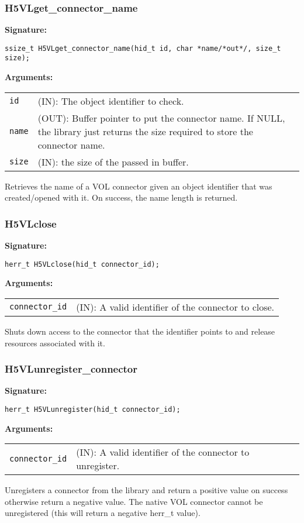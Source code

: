 \subsubsection{H5VLget\_connector\_name}
\begin{mdframed}[style=bgbox]
\textbf{Signature:}
\begin{lstlisting}
ssize_t H5VLget_connector_name(hid_t id, char *name/*out*/, size_t size);
\end{lstlisting}

\textbf{Arguments:}\\
\begin{tabular}{l p{13.5cm}}
  {\tt id} & (IN): The object identifier to check.\\
  {\tt name} & (OUT): Buffer pointer to put the connector name. If NULL, the library just returns the size required to store the connector name.\\
  {\tt size} & (IN): the size of the passed in buffer.\\
\end{tabular}
\end{mdframed}
Retrieves the name of a VOL connector given an object identifier that was created/opened with it. On success, the name length is returned.\bigskip


\subsubsection{H5VLclose}
\begin{mdframed}[style=bgbox]
\textbf{Signature:}
\begin{lstlisting}
herr_t H5VLclose(hid_t connector_id);
\end{lstlisting}

\textbf{Arguments:}\\
\begin{tabular}{l p{13.5cm}}
 {\tt connector\_id} & (IN): A valid identifier of the connector to close.\\
\end{tabular}
\end{mdframed}
Shuts down access to the connector that the identifier points to and release resources associated with it.\bigskip


\subsubsection{H5VLunregister\_connector}
\begin{mdframed}[style=bgbox]
\textbf{Signature:}
\begin{lstlisting}
herr_t H5VLunregister(hid_t connector_id);
\end{lstlisting}
\textbf{Arguments:}\\
\begin{tabular}{l p{13.5cm}}
  {\tt connector\_id} & (IN): A valid identifier of the connector to unregister.\\
\end{tabular}
\end{mdframed}
Unregisters a connector from the library and return a positive value on success otherwise return a negative value. The native VOL connector cannot be unregistered (this will return a negative herr\_t value).\bigskip


